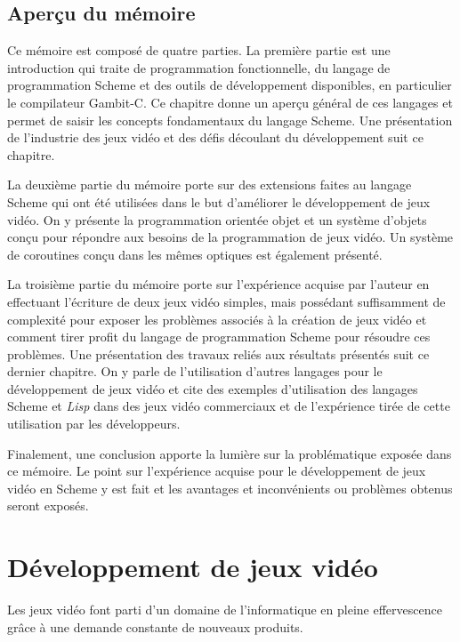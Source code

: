 \documentclass[12pt,oneside,letterpaper,francais]{book}
\newcommand{\lisp}{{\textit{Lisp }}}
\begin{document}
\section{Aperçu du mémoire}
Ce mémoire est composé de quatre parties. La première partie est une
introduction qui traite de programmation fonctionnelle, du langage de
programmation Scheme et des outils de développement disponibles, en
particulier le compilateur Gambit-C. Ce chapitre donne un aperçu
général de ces langages et permet de saisir les concepts fondamentaux
du langage Scheme. Une présentation de l'industrie des jeux vidéo et
des défis découlant du développement suit ce chapitre.

La deuxième partie du mémoire porte sur des extensions faites au
langage Scheme qui ont été utilisées dans le but d'améliorer le
développement de jeux vidéo. On y présente la programmation orientée
objet et un système d'objets conçu pour répondre aux besoins de la
programmation de jeux vidéo. Un système de coroutines conçu dans les
mêmes optiques est également présenté.

La troisième partie du mémoire porte sur l'expérience acquise par
l'auteur en effectuant l'écriture de deux jeux vidéo simples, mais
possédant suffisamment de complexité pour exposer les problèmes
associés à la création de jeux vidéo et comment tirer profit du
langage de programmation Scheme pour résoudre ces problèmes. Une
présentation des travaux reliés aux résultats présentés suit ce
dernier chapitre. On y parle de l'utilisation d'autres langages pour
le développement de jeux vidéo et cite des exemples d'utilisation des
langages Scheme et \lisp dans des jeux vidéo commerciaux et de
l'expérience tirée de cette utilisation par les développeurs.

Finalement, une conclusion apporte la lumière sur la problématique
exposée dans ce mémoire. Le point sur l'expérience acquise pour le
développement de jeux vidéo en Scheme y est fait et les avantages et
inconvénients ou problèmes obtenus seront exposés.




\chapter{Développement de jeux vidéo}
\label{Chap:JV}

Les jeux vidéo font parti d'un domaine de l'informatique en pleine
effervescence grâce à une demande constante de nouveaux
produits. 
\end{document}

